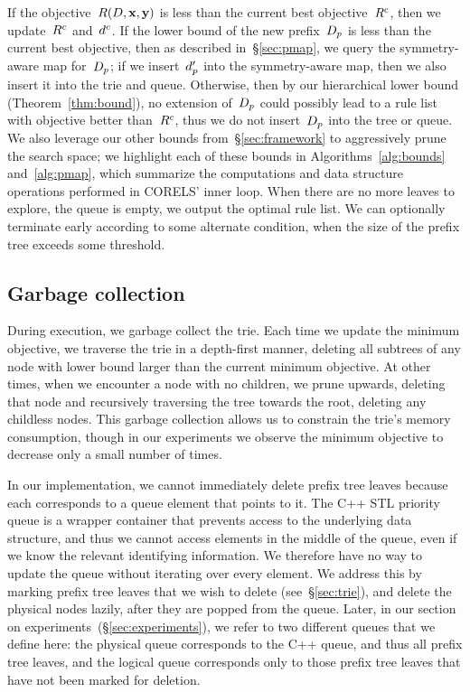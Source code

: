 If the objective~$R({D}, \mathbf{x}, \mathbf{y})$ is less than the current best objective~${R^c}$,
then we update~${R^c}$ and~$d^c$.
%
If the lower bound of the new prefix~$D_p$ is less than the current best objective,
then as described in~\S\ref{sec:pmap}, we query the symmetry-aware map for~$D_p$;
if we insert~$d_p'$ into the symmetry-aware map, then we also insert it into the trie and queue.
%
Otherwise, %
then by our hierarchical lower bound (Theorem~\ref{thm:bound}),
no extension of~$D_p$ could possibly lead to a rule list with objective
better than~${R^c}$, thus we do not insert~$D_p$ into the tree or queue.
%
We also leverage our other bounds from~\S\ref{sec:framework}
to aggressively prune the search space; we highlight each of these bounds
in Algorithms~\ref{alg:bounds} and~\ref{alg:pmap},
which summarize the computations and data structure operations performed in CORELS' inner loop.
%
When there are no more leaves to explore, \ie the queue is empty, we output the optimal rule list.
%
We can optionally terminate early according to some alternate condition,
\eg when the size of the prefix tree exceeds some threshold.

\subsection{Garbage collection}
\label{sec:gc}

During execution, we garbage collect the trie.
%
Each time we update the minimum objective,
we traverse the trie in a depth-first manner, deleting all subtrees
of any node with lower bound larger than the current minimum objective.
%
At other times, when we encounter a node with no children, we prune upwards,
deleting that node and recursively traversing the tree towards the root,
deleting any childless nodes.
%
This garbage collection allows us to constrain the trie's memory consumption, though in our
experiments we observe the minimum objective to decrease only a small number of times.

In our implementation, we cannot immediately delete prefix tree leaves
because each corresponds to a queue element that points to it.
%
The C++ STL priority queue is a wrapper container that prevents access to the
underlying data structure, and thus we cannot access elements in the middle of the queue,
even if we know the relevant identifying information.
%
We therefore have no way to update the queue without iterating over every element.
%
We address this by marking prefix tree leaves that we wish to delete (see~\S\ref{sec:trie}),
and delete the physical nodes lazily, after they are popped from the queue.
%
Later, in our section on experiments~(\S\ref{sec:experiments}),
we refer to two different queues that we define here: the physical queue
corresponds to the C++ queue, and thus all prefix tree leaves, and the logical queue
corresponds only to those prefix tree leaves that have not been marked for deletion.

